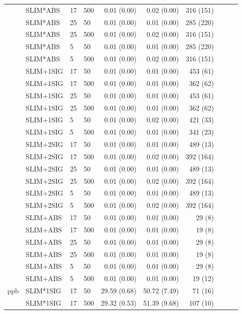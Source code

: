 \begin{longtable}{llllrrrrrr}
 & SLIM*ABS & 17 & 500 & 0.01 (0.00) & 0.02 (0.00) & 316 (151) \\
 & SLIM*ABS & 25 & 50 & 0.01 (0.00) & 0.01 (0.00) & 285 (220) \\
 & SLIM*ABS & 25 & 500 & 0.01 (0.00) & 0.02 (0.00) & 316 (151) \\
 & SLIM*ABS & 5 & 50 & 0.01 (0.00) & 0.01 (0.00) & 285 (220) \\
 & SLIM*ABS & 5 & 500 & 0.01 (0.00) & 0.02 (0.00) & 316 (151) \\
 & SLIM+1SIG & 17 & 50 & 0.01 (0.00) & 0.01 (0.00) & 453 (61) \\
 & SLIM+1SIG & 17 & 500 & 0.01 (0.00) & 0.01 (0.00) & 362 (62) \\
 & SLIM+1SIG & 25 & 50 & 0.01 (0.00) & 0.01 (0.00) & 453 (61) \\
 & SLIM+1SIG & 25 & 500 & 0.01 (0.00) & 0.01 (0.00) & 362 (62) \\
 & SLIM+1SIG & 5 & 50 & 0.01 (0.00) & 0.02 (0.00) & 421 (33) \\
 & SLIM+1SIG & 5 & 500 & 0.01 (0.00) & 0.01 (0.00) & 341 (23) \\
 & SLIM+2SIG & 17 & 50 & 0.01 (0.00) & 0.01 (0.00) & 489 (13) \\
 & SLIM+2SIG & 17 & 500 & 0.01 (0.00) & 0.02 (0.00) & 392 (164) \\
 & SLIM+2SIG & 25 & 50 & 0.01 (0.00) & 0.01 (0.00) & 489 (13) \\
 & SLIM+2SIG & 25 & 500 & 0.01 (0.00) & 0.02 (0.00) & 392 (164) \\
 & SLIM+2SIG & 5 & 50 & 0.01 (0.00) & 0.01 (0.00) & 489 (13) \\
 & SLIM+2SIG & 5 & 500 & 0.01 (0.00) & 0.02 (0.00) & 392 (164) \\
 & SLIM+ABS & 17 & 50 & 0.01 (0.00) & 0.01 (0.00) & 29 (8) \\
 & SLIM+ABS & 17 & 500 & 0.01 (0.00) & 0.01 (0.00) & 19 (8) \\
 & SLIM+ABS & 25 & 50 & 0.01 (0.00) & 0.01 (0.00) & 29 (8) \\
 & SLIM+ABS & 25 & 500 & 0.01 (0.00) & 0.01 (0.00) & 19 (8) \\
 & SLIM+ABS & 5 & 50 & 0.01 (0.00) & 0.01 (0.00) & 29 (8) \\
 & SLIM+ABS & 5 & 500 & 0.01 (0.00) & 0.01 (0.00) & 19 (12) \\
\midrule
ppb & SLIM*1SIG & 17 & 50 & 29.59 (0.68) & 50.72 (7.49) & 71 (16) \\
 & SLIM*1SIG & 17 & 500 & 29.32 (0.53) & 51.39 (9.68) & 107 (10) \\

\end{longtable}
